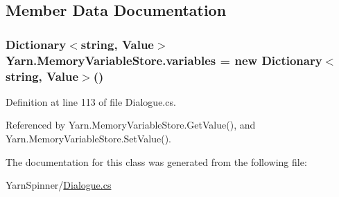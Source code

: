 \subsection{Member Data Documentation}
\hypertarget{a00130_aad18acd95297edb8ed496857337f8071}{
\subsubsection[{variables}]{\setlength{\rightskip}{0pt plus 5cm}Dictionary$<$string, {\bf Value}$>$ Yarn.\-Memory\-Variable\-Store.\-variables = new Dictionary$<$string, {\bf Value}$>$()\hspace{0.3cm}{\ttfamily [private]}}}\label{a00130_aad18acd95297edb8ed496857337f8071}


Definition at line 113 of file Dialogue.\-cs.



Referenced by Yarn.\-Memory\-Variable\-Store.\-Get\-Value(), and Yarn.\-Memory\-Variable\-Store.\-Set\-Value().



The documentation for this class was generated from the following file\-:\begin{DoxyCompactItemize}
\item 
Yarn\-Spinner/\hyperlink{a00285}{Dialogue.\-cs}\end{DoxyCompactItemize}
